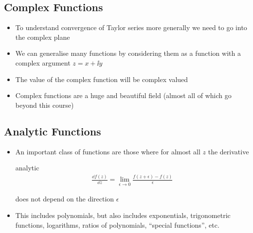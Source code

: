 \begin{slide}
\section{Complex Functions}

\begin{PauseHighLight}
  \begin{itemize}
  \item To understand convergence of Taylor series more generally we
    need to go into the complex plane\pause
  \item We can generalise many functions by considering them as a
    function with a complex argument $z = x + \ii y$\pause
  \item The value of the complex function will be complex valued\pause
  \item Complex functions are a huge and beautiful field (almost all
    of which go beyond this course)\pause
  \end{itemize}
\end{PauseHighLight}
\end{slide}


\begin{slide}
\section[-2]{Analytic Functions}

\begin{PauseHighLight}
  \begin{itemize}
  \item An important class of functions are those where for almost
    all $z$ the derivative\vspace*{-5mm}\\
    \begin{rightImage}[0.3]{analytic}
      \begin{align*}
        \frac{\dd f(z)}{\dd z} = \lim_{\epsilon \rightarrow 0}
        \frac{f(z+\epsilon) - f(z)}{\epsilon}
      \end{align*}
    \end{rightImage}
    does not depend on the direction $\epsilon$\pause
  \item This includes polynomials\pause, but also includes
    exponentials\pauseb, trigonometric functions\pauseb,
    logarithms\pauseb, ratios of polynomials\pauseb, ``special
    functions'', etc.\pauseb
  \end{itemize}
\end{PauseHighLight}
\end{slide}

